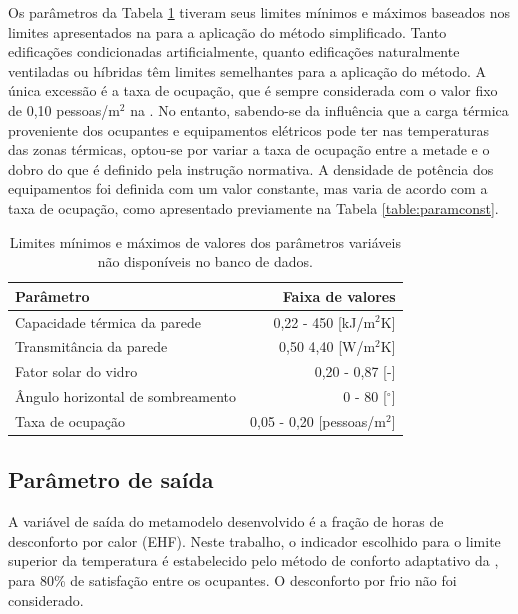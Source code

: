 \documentclass[brazil,hardcopy,openany,a5paper]{ufscthesis}
\begin{document}
		Os parâmetros da Tabela \ref{table:paraminic} tiveram seus limites mínimos e máximos baseados nos limites apresentados na  para a aplicação do método simplificado. Tanto edificações condicionadas artificialmente, quanto edificações naturalmente ventiladas ou híbridas têm limites semelhantes para a aplicação do método.
		A única excessão é a taxa de ocupação, que é sempre considerada com o valor fixo de 0,10 pessoas/m$^2$ na . No entanto, sabendo-se da influência que a carga térmica proveniente dos ocupantes e equipamentos elétricos pode ter nas temperaturas das zonas térmicas, optou-se por variar a taxa de ocupação entre a metade e o dobro do que é definido pela instrução normativa. A densidade de potência dos equipamentos foi definida com um valor constante, mas varia de acordo com a taxa de ocupação, como apresentado previamente na Tabela \ref{table:paramconst}.
		
		\begin{table}[h]
			\centering
			\caption{Limites mínimos e máximos de valores dos parâmetros variáveis não disponíveis no banco de dados.}
			\label{table:paraminic}
			\begin{tabular}{|l |r |}
				\hline
				\textbf{Parâmetro} & \textbf{Faixa de valores} \\
				\hline
				Capacidade térmica da parede & 0,22 - 450 [kJ/m$^2$K] \\
				\hline
				Transmitância da parede & 0,50 4,40 [W/m$^2$K] \\
				\hline
				Fator solar do vidro & 0,20 - 0,87 [-] \\
				\hline 
				Ângulo horizontal de sombreamento & 0 - 80 [$^{\circ}$] \\
				\hline 
				Taxa de ocupação & 0,05 - 0,20 [pessoas/m$^2$] \\
				\hline 
			\end{tabular}
		\end{table}
	
		\subsection{Parâmetro de saída}
		
		A variável de saída do metamodelo desenvolvido é a fração de horas de desconforto por calor (EHF). Neste trabalho, o indicador escolhido para o limite superior da temperatura é estabelecido pelo método de conforto adaptativo da  \cite{ASHRAEStandard552017}, para 80\% de satisfação entre os ocupantes. O desconforto por frio não foi considerado.
\end{document}

